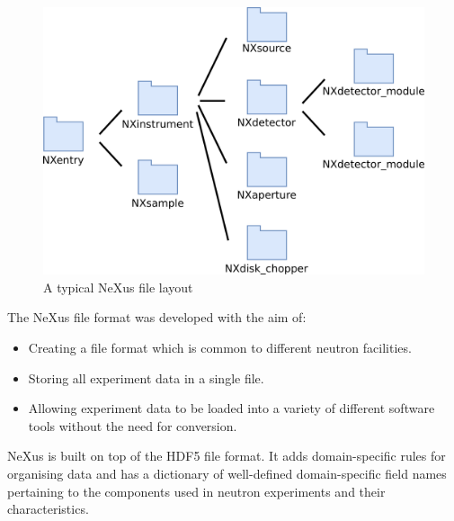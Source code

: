 \begin{figure}
\includegraphics[width=0.6\linewidth]{instrument_arch.png}
\caption{A typical NeXus file layout}
\end{figure}


The NeXus file format was developed with the aim of:
\begin{itemize}
\item Creating a file format which is common to different neutron facilities.
\item Storing all experiment data in a single file.
\item Allowing experiment data to be loaded into a variety of different software tools without the need for conversion.
\end{itemize}

NeXus is built on top of the HDF5 file format. It adds domain-specific rules for organising data and has a dictionary of well-defined domain-specific field names pertaining to the components used in neutron experiments and their characteristics.
